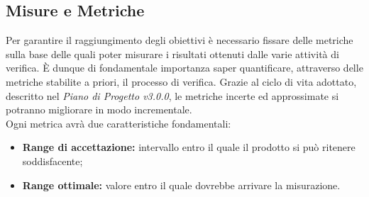 \subsection{Misure e Metriche}
\label{sezione 3.6}
Per garantire il raggiungimento degli obiettivi è necessario fissare delle metriche sulla base delle quali poter misurare i risultati ottenuti dalle varie attività di verifica. È dunque di fondamentale importanza saper quantificare, attraverso delle metriche stabilite a priori, il processo di verifica. Grazie al ciclo di vita adottato, descritto nel \textit{Piano di Progetto v3.0.0}, le metriche incerte ed approssimate si potranno migliorare in modo incrementale.\\
Ogni metrica avrà due caratteristiche fondamentali:
\begin{itemize}
	\item \textbf{Range di accettazione:} intervallo entro il quale il prodotto si può ritenere soddisfacente;
	\item \textbf{Range ottimale:} valore entro il quale dovrebbe arrivare la misurazione.
\end{itemize}

